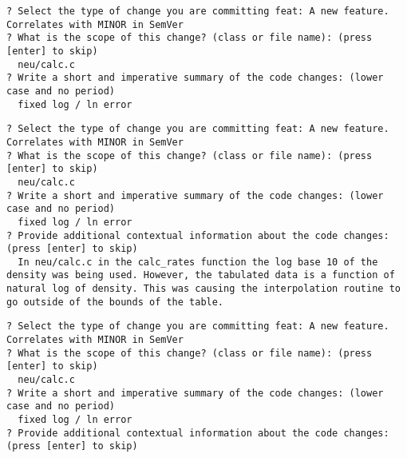 \documentclass{ol-softwaremanual}
\begin{document}
\begin{enumerate}
\begin{terminal}
\texttt{{\color{orange}?} Select the type of change you are committing {\color{orange}feat: A new feature. Correlates with MINOR in SemVer}}\\
\texttt{{\color{orange}?} What is the scope of this change? (class or file name): (press [enter] to skip)}\\
\texttt{ \color{orange}\ neu/calc.c}\\
\texttt{{\color{orange}?} Write a short and imperative summary of the code changes: (lower case and no period)}\\
\texttt{ \color{orange}\ fixed log / ln error}
\end{terminal}
\begin{terminal}
\texttt{{\color{orange}?} Select the type of change you are committing {\color{orange}feat: A new feature. Correlates with MINOR in SemVer}}\\
\texttt{{\color{orange}?} What is the scope of this change? (class or file name): (press [enter] to skip)}\\
\texttt{ \color{orange}\ neu/calc.c}\\
\texttt{{\color{orange}?} Write a short and imperative summary of the code changes: (lower case and no period)}\\
\texttt{ \color{orange}\ fixed log / ln error} \\
\texttt{{\color{orange}?} Provide additional contextual information about the code changes: (press [enter] to skip)} \\
\texttt{\color{orange} \ In neu/calc.c in the calc\_rates function the log base 10 of the density was being used. However, the tabulated data is a function of natural log of density. This was causing the interpolation routine to go outside of the bounds of the table.}
\end{terminal}
\begin{terminal}
\texttt{{\color{orange}?} Select the type of change you are committing {\color{orange}feat: A new feature. Correlates with MINOR in SemVer}}\\
\texttt{{\color{orange}?} What is the scope of this change? (class or file name): (press [enter] to skip)}\\
\texttt{ \color{orange}\ neu/calc.c}\\
\texttt{{\color{orange}?} Write a short and imperative summary of the code changes: (lower case and no period)}\\
\texttt{ \color{orange}\ fixed log / ln error} \\
\texttt{{\color{orange}?} Provide additional contextual information about the code changes: (press [enter] to skip)} \\

\end{terminal}
\end{enumerate}
\end{document}
